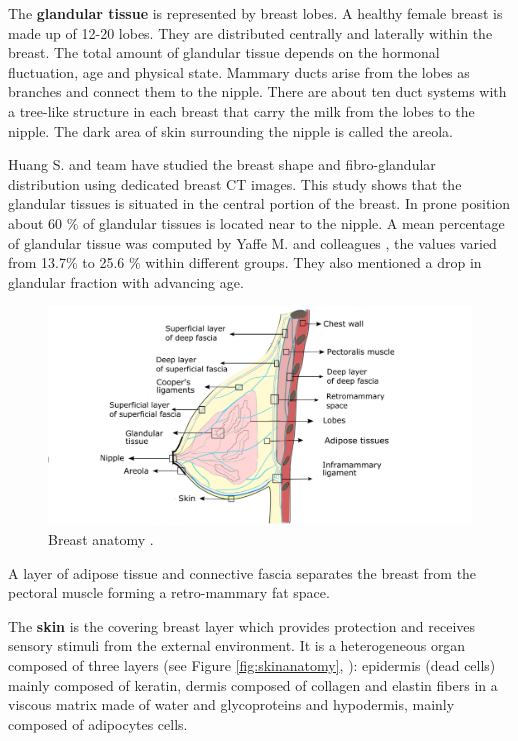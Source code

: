 The \textbf{ glandular tissue} is represented by breast lobes. A healthy female breast is made up of 12-20 lobes. They are distributed centrally and laterally within the breast. The total amount of glandular tissue depends on the hormonal fluctuation, age and physical state.  Mammary ducts arise from the lobes as branches and connect them to the nipple. There are about ten duct systems with a tree-like structure in each breast that carry the milk from the lobes to the nipple. The dark area of skin surrounding the nipple is called the areola.

Huang S. and team  \citep{huang2011characterization} have studied the breast shape and fibro-glandular distribution using dedicated breast CT images. This study shows that the glandular tissues is situated in the central portion of the breast. In prone position about 60 $\%$ of glandular tissues is located near to the nipple. A mean percentage of glandular tissue was computed by Yaffe M. and colleagues \citep{yaffe2009myth}, the values varied from 13.7$\%$ to 25.6 $\%$ within different groups. They also mentioned a drop in glandular fraction with advancing age. 


\begin{center}
\begin{figure}[h]
\includegraphics[width=\textwidth,keepaspectratio]{figures/anatomieSeinEuBlack2.png} 
\caption{Breast anatomy \citep{clemente2011anatomy}.}
\label{fig:breastanatomy}
\end{figure}
\end{center}

 A layer of adipose tissue and connective fascia separates the breast from the pectoral muscle forming a retro-mammary fat space.
 
The \textbf{skin} is the covering breast layer which provides protection and receives sensory stimuli from the external environment. It is a heterogeneous organ composed of three layers (see Figure \ref{fig:skinanatomy}, \citep{kanitakis2002anatomy}): epidermis (dead cells) mainly composed of keratin, dermis composed of collagen and elastin fibers in a viscous matrix made of water and glycoproteins and hypodermis, mainly composed of adipocytes cells.


